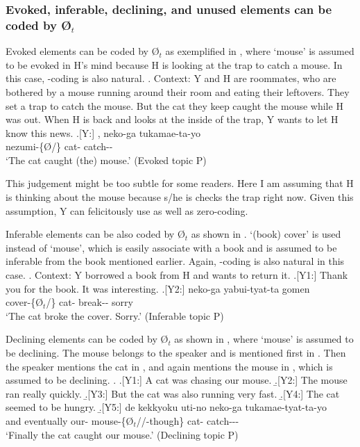 \subsubsection{Evoked, inferable, declining, and unused elements can be coded by {\O$_{t}$}}

Evoked elements can be coded by {\O$_{t}$}
as exemplified in \Next,
where `mouse' is assumed to be evoked in H's mind
because H is looking at the trap to catch a mouse.
In this case, -coding is also natural.
%
\ex. Context: Y and H are roommates,
	who are bothered by a mouse running around their room
	and eating their leftovers.
	They set a trap to catch the mouse.
	But the cat they keep caught the mouse while H was out.
	When H is back and looks at the inside of the trap,
	Y wants to let H know this news.
	\ag.[Y:] , neko-ga tukamae-ta-yo \\
		nezumi-\{{\O}/\} cat- catch-- \\
		`The cat caught (the) mouse.' \hfill{(Evoked topic P)}

This judgement might be too subtle for some readers.
Here I am assuming that H is thinking about the mouse because s/he is checks the trap right now.
Given this assumption, Y can felicitously use  as well as zero-coding.

Inferable elements can be also coded by {\O$_{t}$}
as shown in \Next.
 `(book) cover' is used instead of  `mouse',
which is easily associate with a book and is assumed to be inferable from the book mentioned earlier.
Again, -coding is also natural in this case.
%
\ex. Context: Y borrowed a book from H and wants to return it.
 \a.[Y1:] Thank you for the book. It was interesting.
 \bg.[Y2:]  neko-ga yabui-tyat-ta gomen \\
   cover-\{{\O$_{t}$}/\} cat- break-- sorry \\
   `The cat broke the cover. Sorry.' \hfill{(Inferable topic P)}


Declining elements can be coded by {\O$_{t}$}
as shown in \Next,
where `mouse' is assumed to be declining.
The mouse belongs to the speaker and is mentioned first in \Next[-Y2].
Then the speaker mentions the cat in \Next[-Y3-4],
and again mentions the mouse in \Next[-Y5], which is assumed to be declining.
%
\ex.
 \a.[Y1:] A cat was chasing our mouse.
 \b.[Y2:] The mouse ran really quickly.
 \b.[Y3:] But the cat was also running very fast.
 \b.[Y4:] The cat seemed to be hungry.
 \b.[Y5:] de kekkyoku uti-no  neko-ga tukamae-tyat-ta-yo \\
   and eventually our- {mouse-\{{\O$_{t}$}//-though\}} cat- catch--- \\
   `Finally the cat caught our mouse.' \hfill{(Declining topic P)}

